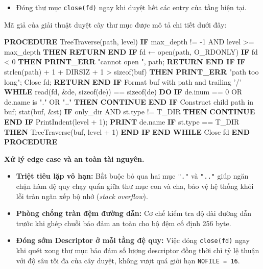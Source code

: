 \documentclass[12pt,a4paper]{article}
\newenvironment{algorithmblock}[1]{%
  \begin{tcolorbox}[
    enhanced,
    breakable,
    colback=white,
    colframe=primary!55,
    colbacktitle=primary,
    coltitle=white,
    boxrule=0.7pt,
    arc=2pt,
    left=10pt,right=10pt,top=7pt,bottom=8pt,
    title={#1},
    fonttitle=\small
  ]
}{%
  \end{tcolorbox}
}
\begin{document}
\begin{enumerate}
\begin{itemize}
\begin{itemize}
      \item Nếu cờ \texttt{only\_dir} bật mà \texttt{st.type != T\_DIR}, bỏ qua không in.
      \item In nhánh thụt lề bằng hàm trợ giúp \texttt{print\_indent(level + 1)} (in các khoảng trắng \texttt{"   "} và ký tự \texttt{"|\_\_ "}) kèm tên \texttt{name}.
      \item Nếu mục là thư mục con (\texttt{st.type == T\_DIR}), gọi đệ quy tiếp tục: \texttt{tree\_traverse(buf, level + 1)}.
    \end{itemize}
    \item Đóng thư mục \texttt{close(fd)} ngay khi duyệt hết các entry của tầng hiện tại.
  \end{itemize}
\end{enumerate}

Mã giả của giải thuật duyệt cây thư mục được mô tả chi tiết dưới đây:

\begin{algorithmblock}{\texttt{tree}}
\begin{algorithmcode}
\textbf{PROCEDURE} TreeTraverse(path, level)
    \textbf{IF} max_depth != -1 AND level >= max_depth \textbf{THEN}
        \textbf{RETURN}
    \textbf{END IF}
    fd ← open(path, O_RDONLY)
    \textbf{IF} fd < 0 \textbf{THEN}
        \textbf{PRINT\_ERR} "cannot open ", path; \textbf{RETURN}
    \textbf{END IF}
    \textbf{IF} strlen(path) + 1 + DIRSIZ + 1 > sizeof(buf) \textbf{THEN}
        \textbf{PRINT\_ERR} "path too long"; Close fd; \textbf{RETURN}
    \textbf{END IF}
    Format buf with path and trailing '/'
    \textbf{WHILE} read(fd, &de, sizeof(de)) == sizeof(de) \textbf{DO}
        \textbf{IF} de.inum == 0 OR de.name is "." OR ".." \textbf{THEN}
            \textbf{CONTINUE}
        \textbf{END IF}
        Construct child path in buf; stat(buf, &st)
        \textbf{IF} only_dir AND st.type != T_DIR \textbf{THEN}
            \textbf{CONTINUE}
        \textbf{END IF}
        PrintIndent(level + 1); \textbf{PRINT} de.name
        \textbf{IF} st.type == T_DIR \textbf{THEN}
            TreeTraverse(buf, level + 1)
        \textbf{END IF}
    \textbf{END WHILE}
    Close fd
\textbf{END PROCEDURE}
\end{algorithmcode}
\end{algorithmblock}

\textbf{Xử lý edge case và an toàn tài nguyên.}
\begin{itemize}
  \item \textbf{Triệt tiêu lặp vô hạn:} Bắt buộc bỏ qua hai mục \texttt{"."} và \texttt{".."} giúp ngăn chặn hàm đệ quy chạy quẩn giữa thư mục con và cha, bảo vệ hệ thống khỏi lỗi tràn ngăn xếp bộ nhớ (\textit{stack overflow}).
  \item \textbf{Phòng chống tràn đệm đường dẫn:} Cơ chế kiểm tra độ dài đường dẫn trước khi ghép chuỗi bảo đảm an toàn cho bộ đệm cố định 256 byte.
  \item \textbf{Đóng sớm Descriptor ở mỗi tầng đệ quy:} Việc đóng \texttt{close(fd)} ngay khi quét xong thư mục bảo đảm số lượng descriptor đồng thời chỉ tỷ lệ thuận với độ sâu tối đa của cây duyệt, không vượt quá giới hạn \texttt{NOFILE = 16}.
\end{itemize}
\end{document}
